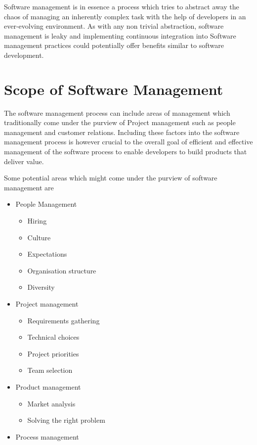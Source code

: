 \documentclass[12pt,conference]{IEEEtran}
\begin{document}
Software management is in essence a process which tries to abstract away the chaos of managing an inherently complex task with the help of developers in an ever-evolving environment. As with any non trivial abstraction, software management is leaky and implementing continuous integration into Software management practices could potentially offer benefits similar to software development.


\section*{Scope of Software Management}

The software management process can include areas of management which traditionally come under the purview of Project management such as people management and customer relations. Including these factors into the software management process is however crucial to the overall goal of efficient and effective management of the software process to enable developers to build products that deliver value.

Some potential areas which might come under the purview of software management are

\begin{itemize}

\item People Management
\begin{itemize}
\item Hiring
\item Culture
\item Expectations
\item Organisation structure
\item Diversity
\end{itemize}

\item Project management
\begin{itemize}
\item Requirements gathering
\item Technical choices
\item Project priorities
\item Team selection
\end{itemize}

\item Product management
\begin{itemize}
\item Market analysis
\item Solving the right problem
\end{itemize}

\item Process management
\end{itemize}
\end{document}
